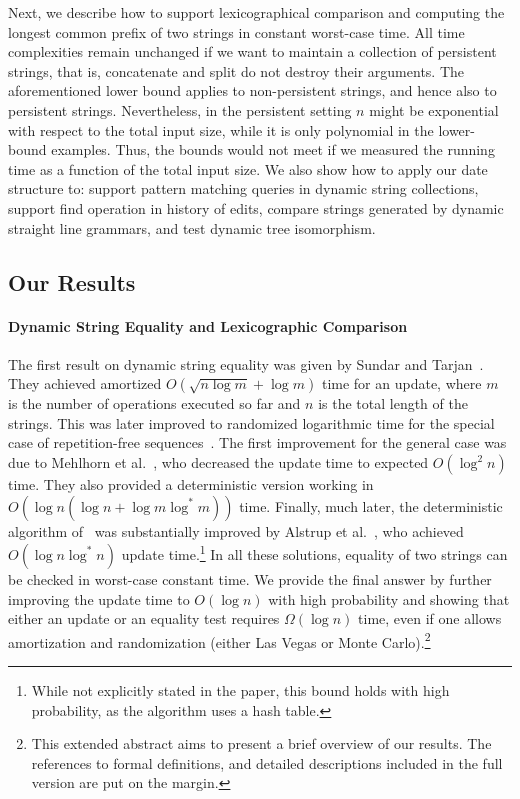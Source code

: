 \documentclass[a4paper]{article}
\newenvironment{shortv}{}{}
\theoremstyle{remark}
\begin{document}
Next, we describe how to support lexicographical comparison and computing the longest
common prefix of two strings in constant worst-case time. All time complexities remain unchanged if we
want to maintain a collection of persistent strings, that is, concatenate and split do not destroy their
arguments. The aforementioned lower bound applies to non-persistent strings, and hence also to persistent
strings. Nevertheless, in the persistent setting $n$ might be exponential with respect to the total input size,
while it is only polynomial in the lower-bound examples.
Thus, the bounds would not meet if we measured the running time as a function of the total input size.
We also show how to apply our date structure to: support pattern matching queries in dynamic string collections, 
support find operation in history of edits, compare strings generated by dynamic straight line grammars, and test dynamic
tree isomorphism. 

\subsection{Our Results}
\paragraph{Dynamic String Equality and Lexicographic Comparison}
The first result on dynamic string equality was given by Sundar and Tarjan~\cite{sundartarjan}.
They achieved amortized $O(\sqrt{n \log m} + \log m)$ time for an update, where $m$ is
the number of operations executed so far and $n$ is the total length of the strings. This was later improved
to randomized logarithmic time for the special case of repetition-free sequences~\cite{Pugh}.
The first improvement for the general case was due to Mehlhorn et al.~\cite{Mehlhorn}, who
decreased the update time to expected $O(\log^2 n)$ time. They also provided a deterministic version
working in $O(\log n (\log n + \log m\log^*m))$ time. Finally, much later, the deterministic algorithm of~\cite{Mehlhorn} was
substantially improved by Alstrup et al.~\cite{Alstrup}, who achieved $O(\log n \log^* n)$
update time.\footnote{While not explicitly stated in the paper, this bound holds with high probability, as the algorithm uses a hash table.} In all these solutions, equality of two strings can be checked in worst-case
constant time. We provide the final answer by further improving the update time to $O(\log n)$ with
high probability and showing that either an update or an equality test requires $\Omega(\log n)$ 
time, even if one allows amortization and randomization (either Las Vegas or Monte Carlo).\begin{shortv}\footnote{This extended abstract aims to present a brief overview of our results. The references to formal definitions, and detailed descriptions included in the full version are put on the margin.}
\end{shortv}
\end{document}
